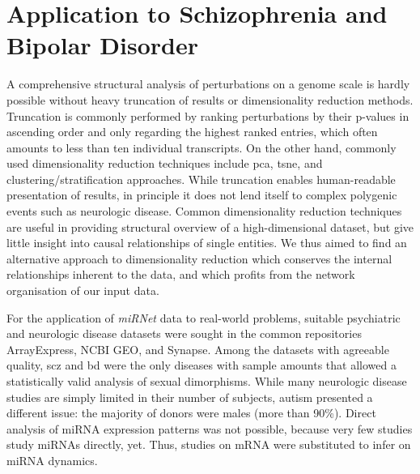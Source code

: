 \section{Application to Schizophrenia and Bipolar Disorder}
A comprehensive structural analysis of perturbations on a genome scale is hardly possible without heavy truncation of results or dimensionality reduction methods. Truncation is commonly performed by ranking perturbations by their p-values in ascending order and only regarding the highest ranked entries, which often amounts to less than ten individual transcripts. On the other hand, commonly used dimensionality reduction techniques include \ac{pca}, \ac{tsne}, and clustering/stratification approaches. While truncation enables human-readable presentation of results, in principle it does not lend itself to complex polygenic events such as neurologic disease. Common dimensionality reduction techniques are useful in providing structural overview of a high-dimensional dataset, but give little insight into causal relationships of single entities. We thus aimed to find an alternative approach to dimensionality reduction which conserves the internal relationships inherent to the data, and which profits from the network organisation of our input data.

For the application of \emph{miRNet} data to real-world problems, suitable psychiatric and neurologic disease datasets were sought in the common repositories ArrayExpress, NCBI GEO, and Synapse. Among the datasets with agreeable quality, \ac{scz} and \ac{bd} were the only diseases with sample amounts that allowed a statistically valid analysis of sexual dimorphisms. While many neurologic disease studies are simply limited in their number of subjects, autism presented a different issue: the majority of donors were males (more than 90\%). Direct analysis of miRNA expression patterns was not possible, because very few studies study miRNAs directly, yet. Thus, studies on mRNA were substituted to infer on miRNA dynamics.

